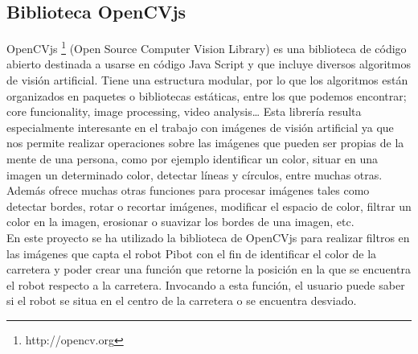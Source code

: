 \documentclass{report}
\begin{document}
\subsection{Biblioteca OpenCVjs}
OpenCVjs \footnote{http://opencv.org} (Open Source Computer Vision Library) es una biblioteca de código abierto destinada a usarse en código Java Script y que incluye diversos algoritmos de visión artificial. Tiene una estructura modular, por lo que los algoritmos están organizados en paquetes o bibliotecas estáticas, entre los que podemos encontrar; core funcionality, image processing, video analysis… Esta librería resulta especialmente interesante en el trabajo con imágenes de visión artificial ya que nos permite realizar operaciones sobre las imágenes que pueden ser propias de la mente de una persona, como por ejemplo identificar un color, situar en una imagen un determinado color, detectar líneas y círculos, entre muchas otras. Además ofrece muchas otras funciones para procesar imágenes tales como detectar bordes, rotar o recortar imágenes, modificar el espacio de color, filtrar un color en la imagen, erosionar o suavizar los bordes de una imagen, etc.
\\

En este proyecto se ha utilizado la biblioteca de OpenCVjs para realizar filtros en las imágenes que capta el robot Pibot con el fin de identificar el color de la carretera y poder crear una función que retorne la posición en la que se encuentra el robot respecto a la carretera. Invocando a esta función, el usuario puede saber si el robot se situa en el centro de la carretera o se encuentra desviado.
\end{document}
